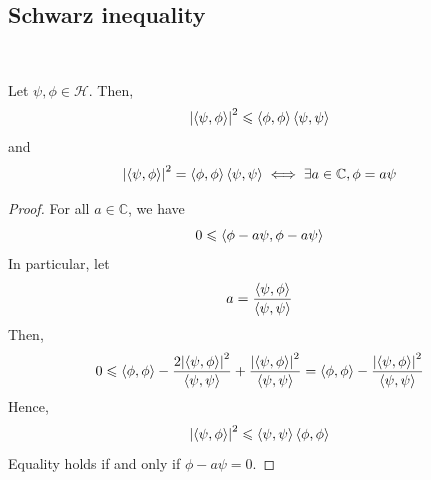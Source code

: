 \documentclass[a4paper]{article}
\begin{document}
\subsection{Schwarz inequality}\ \vspace*{-1.5em}
\begin{theorem}
	Let \( \psi, \phi \in \mathcal H \).
	Then,
	\[
		\abs{\left\langle{\psi, \phi}\right\rangle}^2 \leqslant \left\langle{\phi, \phi}\right\rangle \left\langle{\psi, \psi}\right\rangle
	\]
	and
	\[
		\abs{\left\langle{\psi, \phi}\right\rangle}^2 = \left\langle{\phi, \phi}\right\rangle \left\langle{\psi, \psi}\right\rangle \iff \exists a \in \mathbb C, \phi = a \psi
	\]
\end{theorem}
\begin{proof}
	For all \( a \in \mathbb C \), we have
	\[
		0 \leqslant \left\langle{\phi - a \psi, \phi - a \psi}\right\rangle
	\]
	In particular, let
	\[
		a = \frac{\left\langle{\psi, \phi}\right\rangle}{\left\langle{\psi, \psi}\right\rangle}
	\]
	Then,
	\[
		0 \leqslant \left\langle{\phi, \phi}\right\rangle - \frac{2 \abs{\left\langle{\psi, \phi}\right\rangle}^2}{\left\langle{\psi, \psi}\right\rangle} + \frac{\abs{\left\langle{\psi, \phi}\right\rangle}^2}{\left\langle{\psi, \psi}\right\rangle} = \left\langle{\phi, \phi}\right\rangle - \frac{\abs{\left\langle{\psi, \phi}\right\rangle}^2}{\left\langle{\psi, \psi}\right\rangle}
	\]
	Hence,
	\[
		\abs{\left\langle{\psi, \phi}\right\rangle}^2 \leqslant \left\langle{\psi, \psi}\right\rangle \left\langle{\phi, \phi}\right\rangle
	\]
	Equality holds if and only if \( \phi - a \psi = 0 \).
\end{proof}
\end{document}
